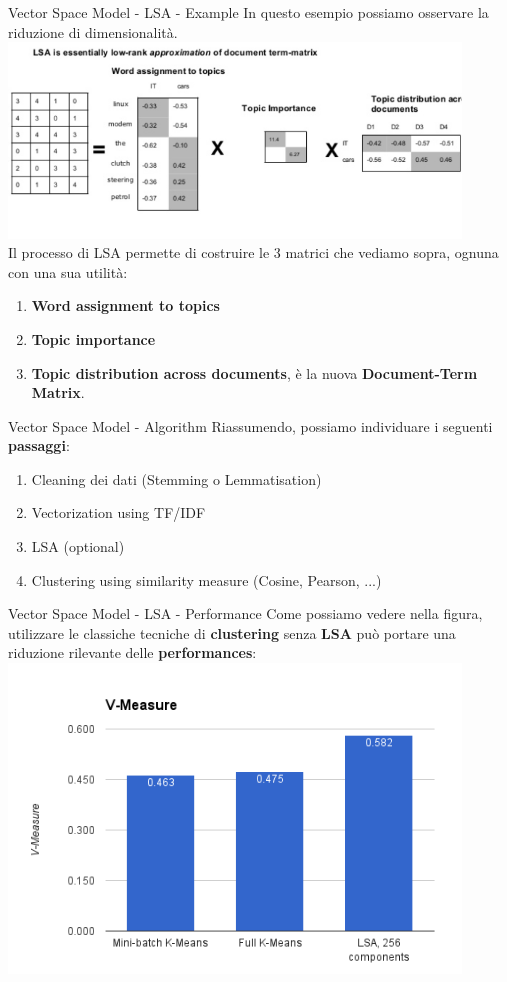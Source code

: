 \documentclass[british]{beamer}
\begin{document}
\begin{frame}{Vector Space Model - LSA - Example}
	In questo esempio possiamo osservare la riduzione di dimensionalit\`{a}.
	\includegraphics[width=0.9\textwidth, height=0.5
	\textheight]{./Imgs/LSA2}\\
	Il processo di LSA permette di costruire le 3 matrici che vediamo sopra, ognuna con una sua utilit\`{a}:
	\begin{enumerate}
		\item \textbf{Word assignment to topics}
		\item \textbf{Topic importance}
		\item \textbf{Topic distribution across documents}, \`{e} la nuova \textbf{Document-Term Matrix}.
	\end{enumerate}
\end{frame}

\begin{frame}{Vector Space Model - Algorithm}
	Riassumendo, possiamo individuare i seguenti \textbf{passaggi}:
	\begin{enumerate}
		\item Cleaning dei dati (Stemming o Lemmatisation)
		\item Vectorization using TF/IDF
		\item LSA (optional)
		\item Clustering using similarity measure (Cosine, Pearson, ...)
	\end{enumerate}
\end{frame}

\begin{frame}{Vector Space Model - LSA - Performance}
	Come possiamo vedere nella figura, utilizzare le classiche tecniche di \textbf{clustering} senza \textbf{LSA} pu\`{o} portare una riduzione rilevante delle \textbf{performances}:
	\includegraphics[width=0.9\textwidth, height=0.7\textheight]{./Imgs/LSAperf}
\end{frame}
\end{document}
